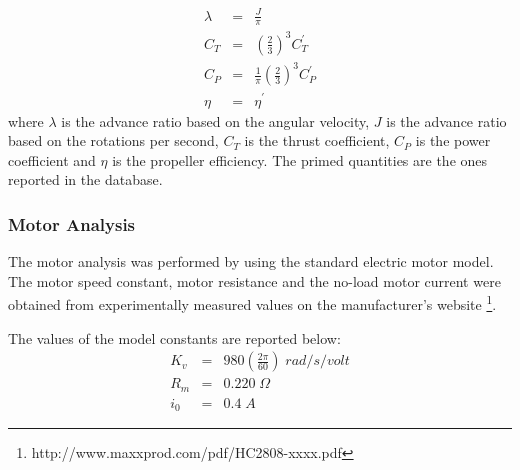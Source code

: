 \documentclass[11pt]{article}
\begin{document}
			\begin{eqnarray*}
				\lambda &=& \frac{J}{\pi} \\
				C_T &=& \left( \frac{2}{3} \right)^3 C_T ^ \prime \\
				C_P &=& \frac{1}{\pi} \left( \frac{2}{3} \right)^3 C_P ^ \prime \\
				\eta &=& \eta ^ \prime
			\end{eqnarray*}
			where $\lambda$ is the advance ratio based on the angular velocity, $J$ is the advance ratio based on the rotations per second, $C_T$ is the thrust coefficient, $C_P$ is the power coefficient and $\eta$ is the propeller efficiency. The primed quantities are the ones reported in the database.

			\subsubsection{Motor Analysis}
			The motor analysis was performed by using the standard electric motor model. The motor speed constant, motor resistance and the no-load motor current were obtained from experimentally measured values on the manufacturer's website \footnote{http://www.maxxprod.com/pdf/HC2808-xxxx.pdf}.

			The values of the model constants are reported below:
			\begin{eqnarray*}
				K_v &=& 980 \left( \frac{2 \pi}{60} \right) \; rad/s/volt \\
				R_m &=& 0.220 \; \Omega \\
				i_0 &=& 0.4 \; A
			\end{eqnarray*}
\end{document}
